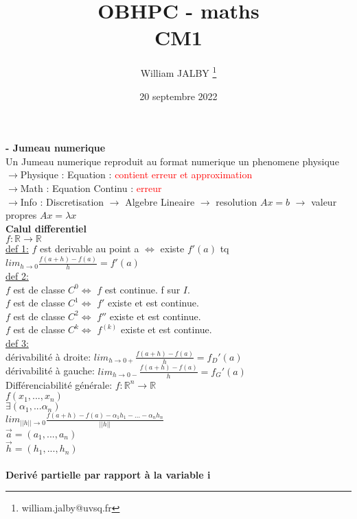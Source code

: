 \documentclass{article}
\title{OBHPC - maths\\CM1}
\author{William JALBY \thanks{william.jalby@uvsq.fr}}
\date{20 septembre 2022}
\begin{document}
    \maketitle
    \textbf{- Jumeau numerique}\\
    Un Jumeau numerique reproduit au format numerique un phenomene physique\\
    $\to$Physique : Equation : \textcolor{red}{contient erreur et approximation}\\
    $\to$Math : Equation Continu : \textcolor{red} {erreur}\\
    $\to$Info : Discretisation $\to$ Algebre Lineaire 
    $\to$ resolution $Ax=b$
    $\to$ valeur propres $Ax=\lambda x$\\
    
    \textbf{Calul differentiel}\\
    $f:\mathbb{R}\to\mathbb{R}$\\
    \underline{def 1:} $f$ est derivable au point a $\Leftrightarrow$ existe $f'(a)$ tq $lim_{h\to 0} \frac{f(a+h)-f(a)}{h}=f'(a)$\\
    \underline{def 2:}\\
    $f$ est de classe $C^0 \Leftrightarrow$ $f$ est continue. f sur $I$.\\
    $f$ est de classe $C^1 \Leftrightarrow$ $f'$ existe et est continue.\\
    $f$ est de classe $C^2 \Leftrightarrow$ $f''$ existe et est continue.\\
    $f$ est de classe $C^k \Leftrightarrow$ $f^(k)$ existe et est continue.\\
    \underline{def 3:}\\
    dérivabilité à droite:
    $lim_{h\to 0+} \frac{f(a+h)-f(a)}{h}=f_D'(a)$\\
    dérivabilité à gauche:
    $lim_{h\to 0-} \frac{f(a+h)-f(a)}{h}=f_G'(a)$\\
    Différenciabilité générale:
    $f: \mathbb{R}^n \to \mathbb{R}$\\
    $f(x_1,...,x_n)$\\
    $\exists(\alpha_1,...\alpha_n)$\\
    $lim_{||h||\to 0} \frac{f(a+h)-f(a)-\alpha_1 h_1 -...-\alpha_n h_n}{||h||}$\\
    $\vec{a}=(a_1,...,a_n)$\\
    $\vec{h}=(h_1,...,h_n)$\\\\
    \textbf{Derivé partielle par rapport à la variable i}\\
\end{document}
